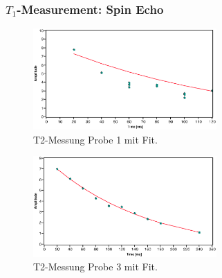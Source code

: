 \documentclass[aspectratio=169]{beamer}
\begin{document}
\begin{frame}
	\frametitle{$T_1$-Measurement: Spin Echo}
	\begin{minipage}[t]{0.45\textwidth}
		\centering
		\begin{figure}
			\includegraphics[width=70mm]{./Resources/t2_meas_p1.eps}
			\caption{T2-Messung Probe 1 mit Fit.}
			\label{fig:t2_p1}
		\end{figure}
	\end{minipage}
	\hfill
	\begin{minipage}[t]{0.45\textwidth}
		\centering
		\begin{figure}
			\includegraphics[width=70mm]{./Resources/t2_meas_p3.eps}
			\caption{T2-Messung Probe 3 mit Fit.}
			\label{fig:t2_p3}
		\end{figure}
	\end{minipage}
\end{frame}
\end{document}
